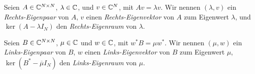 \begin{definition} \label{def:links_rechts_eigen_}

    Seien $A \in \mathbb{C}^{N \times N}$, $\lambda \in \mathbb{C}$, und $v \in \mathbb{C}^N$, mit $A v = \lambda v$.
    Wir nennen $(\lambda, v)$ ein \textit{Rechts-Eigenpaar} von $A$, $v$ einen \textit{Rechts-Eigenvektor} von $A$ zum Eigenwert $\lambda$, und $\ker (A - \lambda I_N)$ den \textit{Rechts-Eigenraum} von $\lambda$.

    Seien $B \in \mathbb{C}^{N \times N}$, $\mu \in \mathbb{C}$ und $w \in \mathbb{C}$, mit $w^\ast B = \mu w^\ast$.
    Wir nennen $(\mu, w)$ ein \textit{Links-Eigenpaar} von $B$, $w$ einen \textit{Links-Eigenvektor} von $B$ zum Eigenwert $\mu$, $\ker (B^\ast - \overline \mu I_N)$ den \textit{Links-Eigenraum} von $\mu$.

\end{definition}

